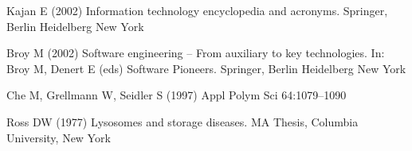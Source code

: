 %
%

%
% 
% 
%
\begin{thebibliography}{99.}
%
%
%
 Kajan E (2002)
Information technology encyclopedia and acronyms. Springer, Berlin
Heidelberg New York

 Broy M (2002) Software engineering -- From
auxiliary to key technologies. In: Broy M, Denert E (eds)
Software Pioneers. Springer, Berlin Heidelberg New York

 Che M, Grellmann W, Seidler S (1997)
Appl Polym Sci 64:1079--1090

 Ross DW (1977) Lysosomes and storage diseases. MA
Thesis, Columbia University, New York

\end{thebibliography}

